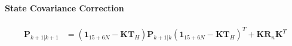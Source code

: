 \documentclass[10pt,letterpaper,fleqn,oneside]{article}
\def\Vec#1{\mathbf{#1}} %
\begin{document}
\paragraph{State Covariance Correction}
\begin{align}
\Vec{P}_{k+1|k+1} &= \left(\Vec{1}_{15+6N} - \Vec{K}\Vec{T}_H \right)\Vec{P}_{k+1|k}\left(\Vec{1}_{15+6N} - \Vec{K}\Vec{T}_H \right)^T + \Vec{K}\Vec{R}_n\Vec{K}^T
\end{align}


%
%

\end{document}
